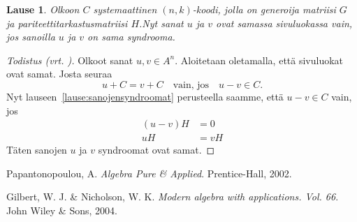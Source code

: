 \documentclass[a4paper,12pt,leqno,oneside]{report} %
\theoremstyle{plain}
\newtheorem{lause}{Lause}[chapter]
\theoremstyle{plain}
\theoremstyle{definition}
\theoremstyle{remark}
\numberwithin{equation}{chapter}
\begin{document}
    \begin{lause}\label{lause:sivuluokkiensyndroomat}
        Olkoon $C$ systemaattinen $(n, k)$-koodi, jolla on generoija matriisi $G$ ja pariteettitarkastusmatriisi $H$.Nyt sanat $u$ ja $v$ ovat samassa sivuluokassa vain, jos sanoilla $u$ ja $v$ on sama syndrooma.
    \end{lause}

    \begin{proof}[Todistus \upshape(vrt. {\cite[s.~500]{PA}})]\label{tod:sivuluokkiensyndroomat}
        Olkoot sanat $u, v \in A^n$. Aloitetaan oletamalla, että sivuluokat ovat samat. Josta seuraa
        \[
            u + C = v + C \quad \text{vain, jos} \quad u - v \in C.
        \]
        Nyt lauseen~\ref{lause:sanojensyndroomat} perusteella saamme, että $u - v \in C$ vain, jos
        \begin{align*}
            (u - v)H &= 0 \\
            uH &= vH
        \end{align*}
        Täten sanojen $u$ ja $v$ syndroomat ovat samat.
    \end{proof} 

    \begin{thebibliography}{9}


        Papantonopoulou, A.
        \emph{Algebra Pure \& Applied}.
        Prentice-Hall, 2002.

        Gilbert, W. J. \& Nicholson, W. K.
        \emph{Modern algebra with applications. Vol. 66}.
        John Wiley \& Sons, 2004.

\end{thebibliography}
\end{document}

